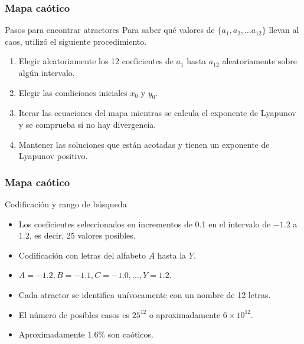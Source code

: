 \documentclass[10pt]{beamer}
\begin{document}
\begin{frame}
    \frametitle{Mapa caótico}
    \begin{block}{Pasos para encontrar atractores}
        \justifying
         Para saber qué valores de $\{a_{1}, a_{2}, \ldots a_{12}\}$ llevan al caos, \cite{Sprott1993} utilizó el siguiente procedimiento.

        \begin{enumerate}
            \item Elegir aleatoriamente los 12 coeficientes de $a_{1}$ hasta $a_{12}$ aleatoriamente sobre algún intervalo.
            \item Elegir las condiciones iniciales $x_{0}$ y $y_{0}$.
            \item Iterar las ecuaciones del mapa mientras se calcula el exponente de Lyapunov y se comprueba si no hay divergencia.
            \item Mantener las soluciones que están acotadas y tienen un exponente de Lyapunov positivo.
        \end{enumerate}              
	\end{block}
\end{frame}


\begin{frame}
    \frametitle{Mapa caótico}
    \begin{block}{Codificación y rango de búsqueda}
        \justifying
        \begin{itemize}
            \item Los coeficientes seleccionados en incrementos de 0.1 en el intervalo de $-1.2$ a $1.2$, es decir, 25 valores posibles.
            \item Codificación con letras del alfabeto $A$ hasta la $Y$.
            \item  $A = -1.2, B = -1.1, C = -1.0, \ldots, Y = 1.2$.
            \item Cada atractor se identifica unívocamente con un nombre de 12 letras.
            \item El número de posibles casos es $25^{12}$ o aproximadamente $6\times 10^{12}$.
            \item Aproximadamente 1.6\% son caóticos.
        \end{itemize}      
	\end{block}
\end{frame}
\end{document}
